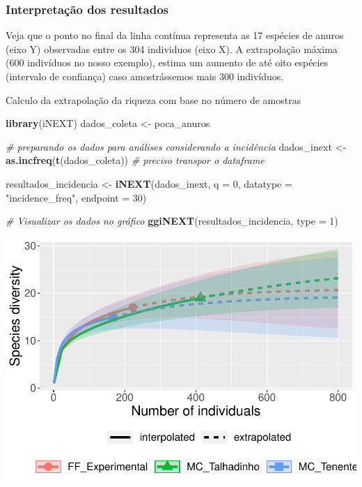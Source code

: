 \documentclass[
]{book}
\newenvironment{Shaded}{\begin{snugshade}}{\end{snugshade}}
\newcommand{\CommentTok}[1]{\textcolor[rgb]{0.56,0.35,0.01}{\textit{#1}}}
\newcommand{\DataTypeTok}[1]{\textcolor[rgb]{0.13,0.29,0.53}{#1}}
\newcommand{\DecValTok}[1]{\textcolor[rgb]{0.00,0.00,0.81}{#1}}
\newcommand{\KeywordTok}[1]{\textcolor[rgb]{0.13,0.29,0.53}{\textbf{#1}}}
\newcommand{\NormalTok}[1]{#1}
\newcommand{\StringTok}[1]{\textcolor[rgb]{0.31,0.60,0.02}{#1}}
\begin{document}
\hypertarget{interpretauxe7uxe3o-dos-resultados-8}{%
\subsubsection{Interpretação dos resultados}\label{interpretauxe7uxe3o-dos-resultados-8}}

Veja que o ponto no final da linha contínua representa as 17 espécies de anuros (eixo Y) observadas entre os 304 individuos (eixo X). A extrapolação máxima (600 indivíduos no nosso exemplo), estima um aumento de até oito espécies (intervalo de confiança) caso amostrássemos mais 300 indivíduos.

Calculo da extrapolação da riqueza com base no número de amostras

\begin{Shaded}
\begin{Highlighting}[]
\KeywordTok{library}\NormalTok{(iNEXT)}
\NormalTok{dados_coleta <-}\StringTok{ }\NormalTok{poca_anuros}

\CommentTok{# preparando os dados para análises considerando a incidência}
\NormalTok{dados_inext <-}\StringTok{ }\KeywordTok{as.incfreq}\NormalTok{(}\KeywordTok{t}\NormalTok{(dados_coleta)) }\CommentTok{# preciso transpor o dataframe}

\NormalTok{resultados_incidencia <-}\StringTok{ }\KeywordTok{iNEXT}\NormalTok{(dados_inext, }\DataTypeTok{q =} \DecValTok{0}\NormalTok{, }\DataTypeTok{datatype =} \StringTok{"incidence_freq"}\NormalTok{, }
            \DataTypeTok{endpoint =} \DecValTok{30}\NormalTok{)}

\CommentTok{# Visualizar os dados no gráfico}
\KeywordTok{ggiNEXT}\NormalTok{(resultados_incidencia, }\DataTypeTok{type =} \DecValTok{1}\NormalTok{)}
\end{Highlighting}
\end{Shaded}

\includegraphics{livro_r_ecologia_files/figure-latex/unnamed-chunk-17-1.pdf}
\end{document}
